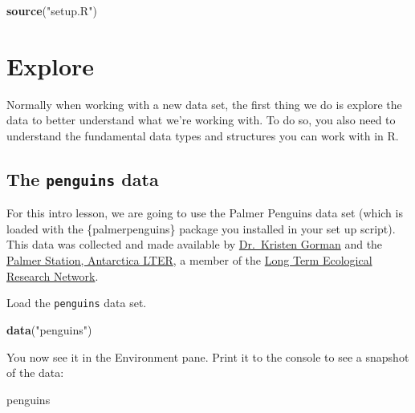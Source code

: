 \documentclass[
]{book}
\newenvironment{Shaded}{\begin{snugshade}}{\end{snugshade}}
\newcommand{\FunctionTok}[1]{\textcolor[rgb]{0.13,0.29,0.53}{\textbf{#1}}}
\newcommand{\NormalTok}[1]{#1}
\newcommand{\StringTok}[1]{\textcolor[rgb]{0.31,0.60,0.02}{#1}}
\begin{document}
\begin{Shaded}
\begin{Highlighting}[]
\FunctionTok{source}\NormalTok{(}\StringTok{"setup.R"}\NormalTok{)}
\end{Highlighting}
\end{Shaded}

\hypertarget{explore}{%
\section{Explore}\label{explore}}

Normally when working with a new data set, the first thing we do is explore the data to better understand what we're working with. To do so, you also need to understand the fundamental data types and structures you can work with in R.

\hypertarget{the-penguins-data}{%
\subsection{\texorpdfstring{The \texttt{penguins} data}{The penguins data}}\label{the-penguins-data}}

For this intro lesson, we are going to use the Palmer Penguins data set (which is loaded with the \{palmerpenguins\} package you installed in your set up script). This data was collected and made available by \href{https://www.uaf.edu/cfos/people/faculty/detail/kristen-gorman.php}{Dr.~Kristen Gorman} and the \href{https://pallter.marine.rutgers.edu/}{Palmer Station, Antarctica LTER}, a member of the \href{https://lternet.edu/}{Long Term Ecological Research Network}.

Load the \texttt{penguins} data set.

\begin{Shaded}
\begin{Highlighting}[]
\FunctionTok{data}\NormalTok{(}\StringTok{"penguins"}\NormalTok{)}
\end{Highlighting}
\end{Shaded}

You now see it in the Environment pane. Print it to the console to see a snapshot of the data:

\begin{Shaded}
\begin{Highlighting}[]
\NormalTok{penguins}
\end{Highlighting}
\end{Shaded}
\end{document}
